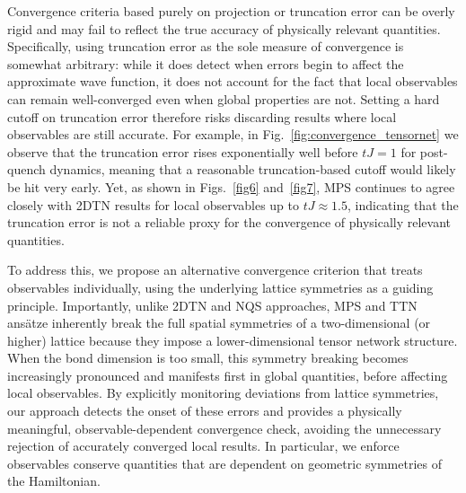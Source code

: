 \documentclass[aps,pra,reprint,amssymb,superscriptaddress]{revtex4-2}
\begin{document}
Convergence criteria based purely on projection or truncation error can be overly rigid and may fail to reflect the true accuracy of physically relevant quantities. Specifically, using truncation error as the sole measure of convergence is somewhat arbitrary: while it does detect when errors begin to affect the approximate wave function, it does not account for the fact that local observables can remain well-converged even when global properties are not. Setting a hard cutoff on truncation error therefore risks discarding results where local observables are still accurate. For example, in Fig.~\ref{fig:convergence_tensornet} we observe that the truncation error rises exponentially well before $tJ=1$ for post-quench dynamics, meaning that a reasonable truncation-based cutoff would likely be hit very early. Yet, as shown in Figs.~\ref{fig6} and~\ref{fig7}, MPS continues to agree closely with 2DTN results for local observables up to $tJ\approx1.5$, indicating that the truncation error is not a reliable proxy for the convergence of physically relevant quantities.

To address this, we propose an alternative convergence criterion that treats observables individually, using the underlying lattice symmetries as a guiding principle. Importantly, unlike 2DTN and NQS approaches, MPS and TTN ansätze inherently break the full spatial symmetries of a two-dimensional (or higher) lattice because they impose a lower-dimensional tensor network structure. When the bond dimension is too small, this symmetry breaking becomes increasingly pronounced and manifests first in global quantities, before affecting local observables. By explicitly monitoring deviations from lattice symmetries, our approach detects the onset of these errors and provides a physically meaningful, observable-dependent convergence check, avoiding the unnecessary rejection of accurately converged local results.
In particular, we enforce observables conserve quantities that are dependent on geometric symmetries of the Hamiltonian.
\end{document}
